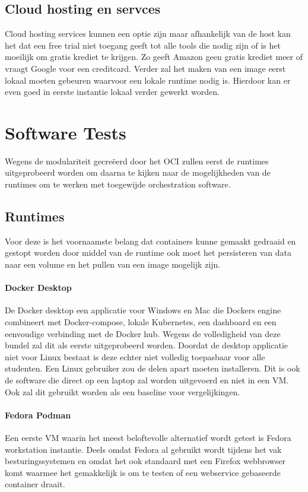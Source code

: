 \subsection{Cloud hosting en servces}
Cloud hosting services kunnen een optie zijn maar afhankelijk van de host kan het dat een free trial niet toegang geeft tot alle tools die nodig zijn of is het moeilijk om gratis krediet te krijgen. Zo geeft Amazon geen gratis krediet meer of vraagt Google voor een creditcard.  Verder zal het maken van een image eerst lokaal moeten gebeuren waarvoor een lokale runtime nodig is. Hierdoor kan er even goed in eerste instantie lokaal verder gewerkt worden.

\section{Software Tests}
Wegens de modulariteit gecreëerd door het OCI zullen eerst de runtimes uitgeprobeerd worden om daarna te kijken naar de mogelijkheden van de runtimes om te werken met toegewijde orchestration software.

\subsection{Runtimes}
Voor deze is het voornaamste belang dat containers kunne gemaakt gedraaid en gestopt worden door middel van de runtime ook moet het persisteren van data naar een volume en het pullen van een image mogelijk zijn.

\paragraph{Docker Desktop}
De Docker desktop een applicatie voor Windows en Mac die Dockers engine combineert met Docker-compose, lokale Kubernetes, een dashboard en een eenvoudige verbinding met de Docker hub. Wegens de volledigheid van deze bundel zal dit als eerste uitgeprobeerd worden. Doordat de desktop applicatie niet voor Linux bestaat is deze echter niet volledig toepasbaar voor alle studenten. Een Linux gebruiker zou de delen apart moeten installeren. Dit is ook de software die direct op een laptop zal worden uitgevoerd en niet in een VM. Ook zal dit gebruikt worden als een baseline voor vergelijkingen. 

\paragraph{Fedora Podman}
Een eerste VM waarin het meest beloftevolle alternatief wordt getest is Fedora workstation instantie. Deels omdat Fedora al gebruikt wordt tijdens het vak besturingssystemen en omdat het ook standaard met een Firefox webbrowser komt waarmee het gemakkelijk is om te testen of een webservice gebaseerde container draait.

